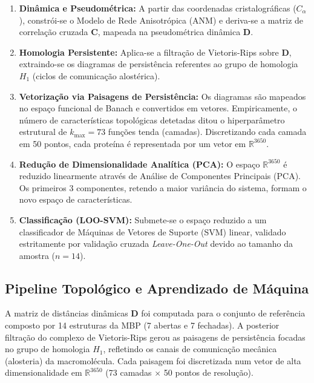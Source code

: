 \documentclass[12pt, a4paper]{article}
\begin{document}
\begin{enumerate}
    \item \textbf{Dinâmica e Pseudométrica:} A partir das coordenadas cristalográficas ($C_\alpha$), constrói-se o Modelo de Rede Anisotrópica (ANM) e deriva-se a matriz de correlação cruzada $\mathbf{C}$, mapeada na pseudométrica dinâmica $\mathbf{D}$.
    \item \textbf{Homologia Persistente:} Aplica-se a filtração de Vietoris-Rips sobre $\mathbf{D}$, extraindo-se os diagramas de persistência referentes ao grupo de homologia $H_1$ (ciclos de comunicação alostérica).
    \item \textbf{Vetorização via Paisagens de Persistência:} Os diagramas são mapeados no espaço funcional de Banach e convertidos em vetores. Empiricamente, o número de características topológicas detetadas ditou o hiperparâmetro estrutural de $k_{\max} = 73$ funções tenda (camadas). Discretizando cada camada em 50 pontos, cada proteína é representada por um vetor em $\mathbb{R}^{3650}$.
    \item \textbf{Redução de Dimensionalidade Analítica (PCA):} O espaço $\mathbb{R}^{3650}$ é reduzido linearmente através de Análise de Componentes Principais (PCA). Os primeiros 3 componentes, retendo a maior variância do sistema, formam o novo espaço de características.
    \item \textbf{Classificação (LOO-SVM):} Submete-se o espaço reduzido a um classificador de Máquinas de Vetores de Suporte (SVM) linear, validado estritamente por validação cruzada \textit{Leave-One-Out} devido ao tamanho da amostra ($n=14$).
\end{enumerate}
 
\subsection{Pipeline Topológico e Aprendizado de Máquina}
\label{subsec:res_svm}

A matriz de distâncias dinâmicas $\mathbf{D}$ foi computada para o conjunto de referência composto por 14 estruturas da MBP (7 abertas e 7 fechadas). A posterior filtração do complexo de Vietoris-Rips gerou as paisagens de persistência focadas no grupo de homologia $H_1$, refletindo os canais de comunicação mecânica (alosteria) da macromolécula. Cada paisagem foi discretizada num vetor de alta dimensionalidade em $\mathbb{R}^{3650}$ (73 camadas $\times$ 50 pontos de resolução).
\end{document}
